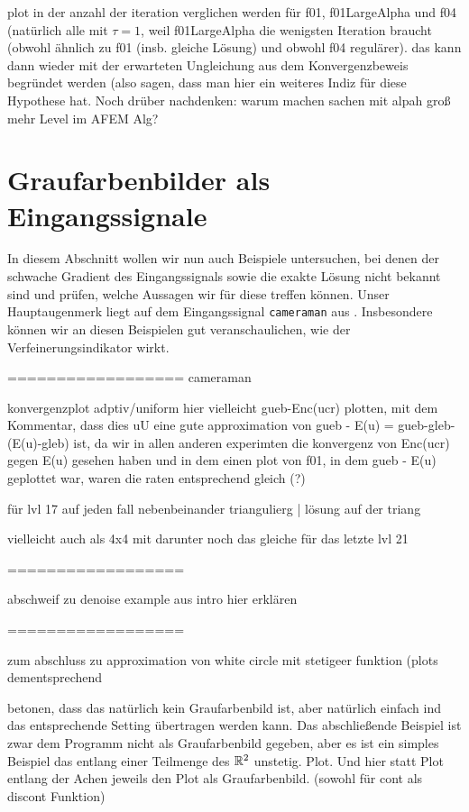 plot in der anzahl der iteration verglichen werden für f01,
f01LargeAlpha und f04 (natürlich alle mit $\tau=1$, weil  f01LargeAlpha die
wenigsten Iteration braucht (obwohl ähnlich
zu f01 (insb. gleiche Lösung) und obwohl f04 regulärer). 
das kann dann wieder
mit der erwarteten Ungleichung aus dem Konvergenzbeweis begründet werden (also
sagen, dass man hier ein weiteres Indiz für diese Hypothese hat.
Noch drüber nachdenken: warum machen sachen mit alpah groß mehr Level im AFEM
Alg?


\section{Graufarbenbilder als Eingangssignale}
\label{sec:grayscalePicturesAsInputSignal}

In diesem Abschnitt wollen wir nun auch Beispiele untersuchen, bei denen
der schwache Gradient des Eingangssignals sowie die exakte Lösung nicht bekannt
sind und prüfen, welche Aussagen wir für diese treffen können.
Unser Hauptaugenmerk liegt auf dem Eingangssignal \texttt{cameraman} aus
. 
Insbesondere können wir an diesen Beispielen gut veranschaulichen, wie
der Verfeinerungsindikator wirkt.

==================
cameraman 

konvergenzplot adptiv/uniform
hier vielleicht gueb-Enc(ucr) plotten, mit dem Kommentar, dass dies uU
eine gute approximation von gueb - E(u) = gueb-gleb-(E(u)-gleb) ist, da 
wir in allen anderen experimten die konvergenz von Enc(ucr) gegen E(u) gesehen
haben und in dem einen plot von f01, in dem gueb - E(u) geplottet war,
 waren die raten entsprechend gleich (?)

für lvl 17 auf jeden fall nebenbeinander triangulierg | lösung auf der triang

vielleicht auch als 4x4 mit darunter noch das gleiche für das letzte lvl 21

==================

abschweif zu denoise example aus intro hier erklären

==================

zum abschluss zu approximation von white circle mit stetigeer funktion (plots
dementsprechend

betonen, dass das natürlich kein Graufarbenbild ist, aber natürlich einfach
ind das entsprechende Setting übertragen werden kann.
Das abschließende Beispiel ist zwar dem Programm nicht als Graufarbenbild 
gegeben, aber es ist ein simples Beispiel das entlang einer Teilmenge des
$\mathbb{R}^2$ unstetig. Plot. Und hier statt Plot entlang der Achen jeweils
den Plot als Graufarbenbild. (sowohl für cont als discont Funktion)

